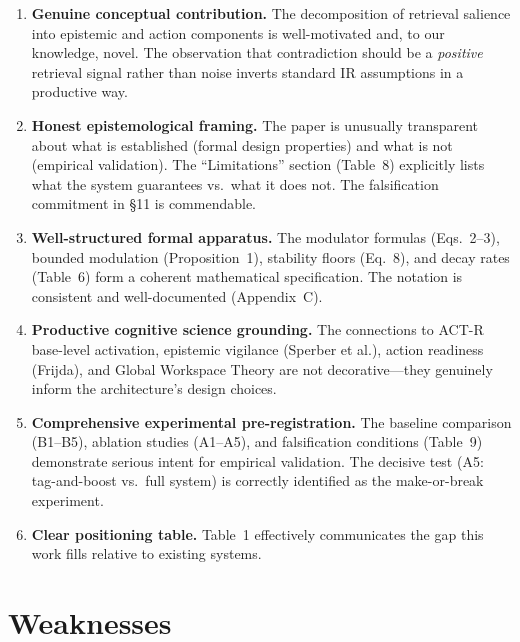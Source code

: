 \documentclass[11pt,a4paper]{article}
\begin{document}
\begin{enumerate}[label=\textbf{S\arabic*.}, leftmargin=2cm]

\item \textbf{Genuine conceptual contribution.} The decomposition of retrieval salience into epistemic and action components is well-motivated and, to our knowledge, novel. The observation that contradiction should be a \emph{positive} retrieval signal rather than noise inverts standard IR assumptions in a productive way.

\item \textbf{Honest epistemological framing.} The paper is unusually transparent about what is established (formal design properties) and what is not (empirical validation). The ``Limitations'' section (Table~8) explicitly lists what the system guarantees vs.\ what it does not. The falsification commitment in \S11 is commendable.

\item \textbf{Well-structured formal apparatus.} The modulator formulas (Eqs.~2--3), bounded modulation (Proposition~1), stability floors (Eq.~8), and decay rates (Table~6) form a coherent mathematical specification. The notation is consistent and well-documented (Appendix~C).

\item \textbf{Productive cognitive science grounding.} The connections to ACT-R base-level activation, epistemic vigilance (Sperber et al.), action readiness (Frijda), and Global Workspace Theory are not decorative---they genuinely inform the architecture's design choices.

\item \textbf{Comprehensive experimental pre-registration.} The baseline comparison (B1--B5), ablation studies (A1--A5), and falsification conditions (Table~9) demonstrate serious intent for empirical validation. The decisive test (A5: tag-and-boost vs.\ full system) is correctly identified as the make-or-break experiment.

\item \textbf{Clear positioning table.} Table~1 effectively communicates the gap this work fills relative to existing systems.

\end{enumerate}

\section{Weaknesses}
\end{document}
